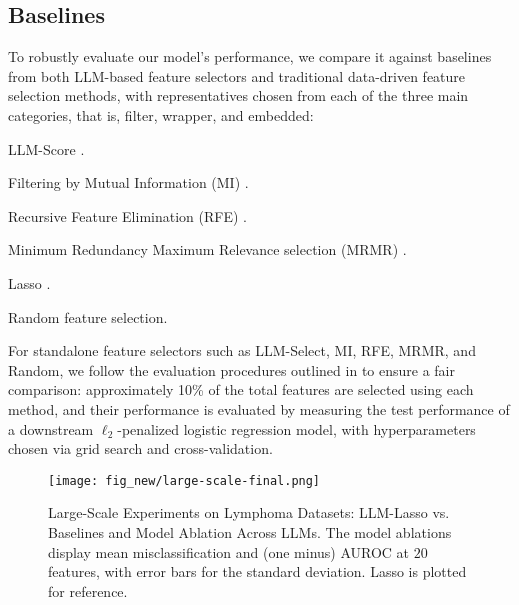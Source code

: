 \subsection{Baselines}\label{sec:baselines} To robustly evaluate our model's performance, we compare it against baselines from both LLM-based feature selectors and traditional data-driven feature selection methods, with representatives chosen from each of the three main categories, that is, filter, wrapper, and embedded:
\begin{compactenum}
    \item LLM-Score \citep{jeong2024llmselectfeatureselectionlarge}.
    \item Filtering by Mutual Information (MI) \citep{lewis1992feature}.
    \item Recursive Feature Elimination (RFE) \citep{guyon2002gene}.
    \item Minimum Redundancy Maximum Relevance selection (MRMR) \citep{ding2005minimum}.
    \item Lasso \citep{tibshirani1996LASSO}.
    \item Random feature selection.
\end{compactenum}
For standalone feature selectors such as LLM-Select, MI, RFE, MRMR, and Random, we follow the evaluation procedures outlined in \cite{jeong2024llmselectfeatureselectionlarge} to ensure a fair comparison: approximately 10\% of the total features are selected using each method, and their performance is evaluated by measuring the test performance of a downstream $\ell_2$-penalized logistic regression model, with hyperparameters chosen via grid search and cross-validation. 

\begin{figure*}[htp]
    \centering    \texttt{[image: fig\_new/large-scale-final.png]}
    \vspace{-0.5em}
    \caption{Large-Scale Experiments on Lymphoma Datasets: LLM-Lasso vs. Baselines and Model Ablation Across LLMs.
    The model ablations display mean misclassification  and (one minus) AUROC at $20$ features, with error bars for the standard deviation.
    Lasso is plotted for reference.}
\label{fig:experiments_test_error}
\end{figure*}
